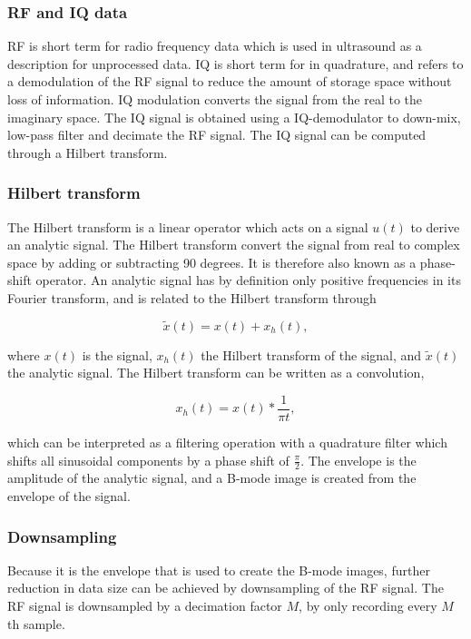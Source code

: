 \subsubsection{RF and IQ data}
RF is short term for radio frequency data which is used in ultrasound as a description for unprocessed data. IQ is short term for in quadrature, and refers to a demodulation of the RF signal to reduce the amount of storage space without loss of information. IQ modulation converts the signal from the real to the imaginary space. The IQ signal is obtained using a IQ-demodulator to down-mix, low-pass filter and decimate the RF signal. The IQ signal can be computed through a Hilbert transform\cite{Kirkhorn1999}.

\subsubsection{Hilbert transform}
The Hilbert transform is a linear operator which acts on a signal $u(t)$ to derive an analytic signal. The Hilbert transform convert the signal from real to complex space by adding or subtracting 90 degrees. It is therefore also known as a phase-shift operator. An analytic signal has by definition only positive frequencies in its Fourier transform, and is related to the Hilbert transform through 

\begin{equation}
\tilde{x}(t) = x(t) + x_h(t),
\end{equation}

where $x(t)$ is the signal, $x_h(t)$ the Hilbert transform of the signal, and $\tilde{x}(t)$ the analytic signal. The Hilbert transform can be written as a convolution, 

\begin{equation}
x_h(t) = x(t)*\frac{1}{\pi t},
\end{equation}

which can be interpreted as a filtering operation with a quadrature filter which shifts all sinusoidal components by a phase shift of $\frac{\pi}{2}$. The envelope is the amplitude of the analytic signal, and a B-mode image is created from the envelope of the signal. 

\subsubsection{Downsampling}
Because it is the envelope that is used to create the B-mode images, further reduction in data size can be achieved by downsampling of the RF signal. The RF signal is downsampled by a decimation factor $M$, by only recording every $M$th sample. 

